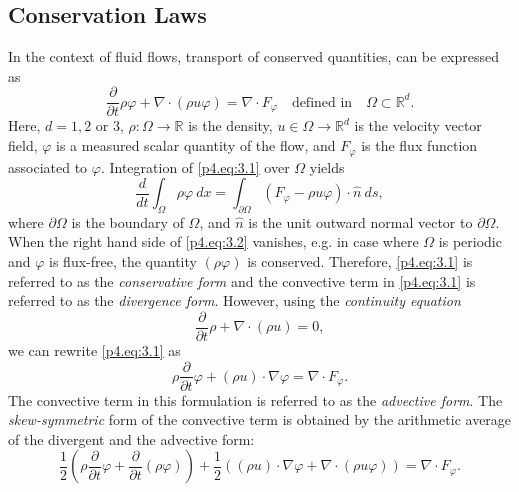 \subsection{Conservation Laws} \label{p4.sec:skew.1}
In the context of fluid flows, transport of conserved quantities, can be expressed as
\begin{equation} \label{p4.eq:3.1}
	\frac{\partial }{\partial t} \rho \varphi + \nabla \cdot ( \rho u \varphi  ) = \nabla \cdot F_{\varphi}\quad \text{defined in} \quad \Omega \subset \mathbb R^{d}.
\end{equation}
Here, $d = 1,2$ or $3$, $\rho:\Omega\to \mathbb R$ is the density, $u\in \Omega \to \mathbb R^{d}$ is the velocity vector field, $\varphi$ is a measured scalar quantity of the flow, and $F_{\varphi}$ is the flux function associated to $\varphi$. Integration of \eqref{p4.eq:3.1} over $ \Omega$ yields
\begin{equation} \label{p4.eq:3.2}
	\frac{d}{dt} \int_{\Omega} \rho \varphi \ dx = \int_{\partial \Omega} (F_{\varphi} - \rho u \varphi) \cdot \hat n\ ds,
\end{equation}
where $\partial \Omega$ is the boundary of $\Omega$, and $\hat n$ is the unit outward normal vector to $\partial \Omega$. When the right hand side of \eqref{p4.eq:3.2} vanishes, e.g. in case where $\Omega$ is periodic and $\varphi$ is flux-free, the quantity $(\rho \varphi)$ is conserved. Therefore, \eqref{p4.eq:3.1} is referred to as the \emph{conservative form} and the convective term in \eqref{p4.eq:3.1} is referred to as the \emph{divergence form}. However, using the \emph{continuity equation}
\begin{equation} \label{p4.eq:3.3}
	\frac{\partial }{\partial t} \rho + \nabla \cdot (\rho u) = 0,
\end{equation}
we can rewrite \eqref{p4.eq:3.1} as
\begin{equation} \label{p4.eq:3.4}
	\rho \frac{\partial }{\partial t} \varphi + (\rho u)\cdot \nabla \varphi = \nabla \cdot F_{\varphi}.
\end{equation}
The convective term in this formulation is referred to as the \emph{advective form}. The \emph{skew-symmetric} form of the convective term is obtained by the arithmetic average of the divergent and the advective form:
\begin{equation} \label{p4.eq:3.5}
	\frac{1}{2} \left( \rho \frac{\partial }{\partial t} \varphi + \frac{\partial }{\partial t} (\rho \varphi) \right) + \frac 1 2 \left( (\rho u)\cdot \nabla \varphi + \nabla \cdot (\rho u \varphi) \right) = \nabla \cdot F_{\varphi}.
\end{equation}
